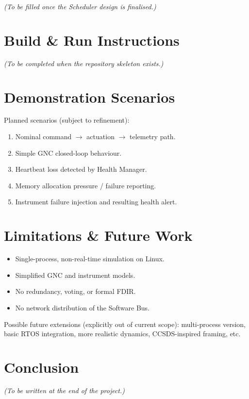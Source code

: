 \documentclass[11pt,a4paper]{article}
\begin{document}
\textit{(To be filled once the Scheduler design is finalised.)}

\section{Build \& Run Instructions}

\textit{(To be completed when the repository skeleton exists.)}

\section{Demonstration Scenarios}

Planned scenarios (subject to refinement):

\begin{enumerate}
    \item Nominal command $\rightarrow$ actuation $\rightarrow$ telemetry path.
    \item Simple GNC closed-loop behaviour.
    \item Heartbeat loss detected by Health Manager.
    \item Memory allocation pressure / failure reporting.
    \item Instrument failure injection and resulting health alert.
\end{enumerate}

\section{Limitations \& Future Work}

\begin{itemize}
    \item Single-process, non-real-time simulation on Linux.
    \item Simplified GNC and instrument models.
    \item No redundancy, voting, or formal FDIR.
    \item No network distribution of the Software Bus.
\end{itemize}

Possible future extensions (explicitly out of current scope): multi-process version, basic RTOS integration, more realistic dynamics, CCSDS-inspired framing, etc.

\section{Conclusion}

\textit{(To be written at the end of the project.)}
\end{document}

